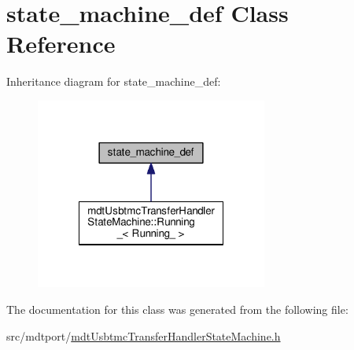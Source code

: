\hypertarget{classstate__machine__def}{\section{state\-\_\-machine\-\_\-def Class Reference}
\label{classstate__machine__def}
}


Inheritance diagram for state\-\_\-machine\-\_\-def\-:
\nopagebreak
\begin{figure}[H]
\begin{center}
\leavevmode
\includegraphics[width=216pt]{classstate__machine__def__inherit__graph}
\end{center}
\end{figure}


The documentation for this class was generated from the following file\-:\begin{DoxyCompactItemize}
\item 
src/mdtport/\hyperlink{mdt_usbtmc_transfer_handler_state_machine_8h}{mdt\-Usbtmc\-Transfer\-Handler\-State\-Machine.\-h}\end{DoxyCompactItemize}
